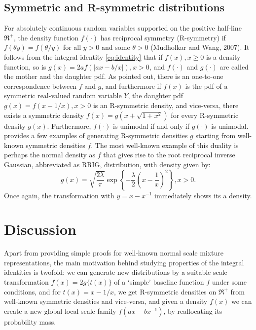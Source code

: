 \documentclass[letterpaper,11pt]{article}
\begin{document}
\subsection{Symmetric and R-symmetric distributions}

For absolutely continuous random variables supported on the positive half-line $\Re^{+}$, the density function $f(\cdot)$ has reciprocal symmetry (R-symmetry) if $f(\theta y) = f(\theta / y)$ for all $y > 0$ and some $\theta >0$ (Mudholkar and Wang, 2007). It follows from the integral identity \eqref{eq:identity} that if $f(x), x \geq 0$ is a density function, so is $g(x) = 2a f(|ax-b/x|), x >0$, and $f(\cdot)$ and $g(\cdot)$ are called the mother and the daughter pdf. As \cite{chaubey2010reciprocal} pointed out, there is an one-to-one correspondence between $f$ and $g$, and furthermore if $f(x)$ is the pdf of a symmetric real-valued random variable $Y$, the daughter pdf $g(x) = f(x-1/x), x>0$ is an R-symmetric density, and vice-versa, there exists a symmetric density $f(x) = g(x+\sqrt{1+x^2})$ for every R-symmetric density $g(x)$. Furthermore, $f(\cdot)$ is unimodal if and only if $g(\cdot)$ is unimodal. \cite{chaubey2010reciprocal} provides a few examples of generating R-symmetric densities $g$ starting from well-known symmetric densities $f$. The most well-known example of this duality is perhaps the normal density as $f$ that gives rise to the root reciprocal inverse Gaussian, abbreviated as RRIG, distribution, with density given by: 
$$
g(x) = \sqrt{\frac{2\lambda}{\pi}} \exp \left\{ - \frac{\lambda}{2} \left( x - \frac{1}{x} \right)^2 \right\}, x >0.
$$
Once again, the \CS transformation with $y = x - x^{-1}$ immediately shows its a density. 

\section{Discussion}

Apart from providing simple proofs for well-known normal scale mixture representations, the main motivation behind studying properties of the integral identities is twofold: we can generate new distributions by a suitable scale transformation $f(x) = 2g\{ t(x) \}$ of a `simple' baseline function $f$ under some conditions, and for $t(x) = x - 1/x$, we get R-symmetric densities on $\Re^+$ from well-known symmetric densities and vice-versa, and given a density $f(x)$ we can create a new global-local scale family $f(ax-bx^{-1})$, by reallocating its probability mass. 
\end{document}
